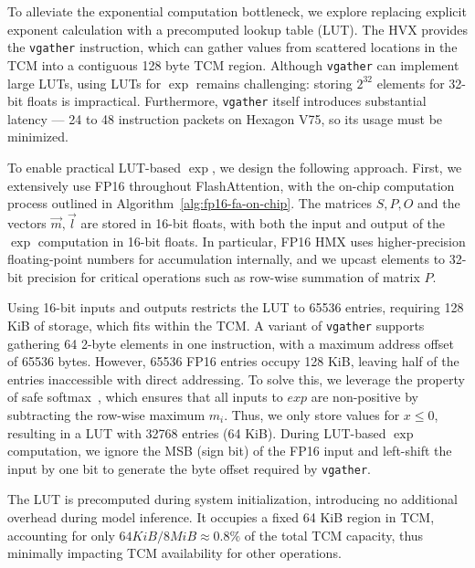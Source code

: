 To alleviate the exponential computation bottleneck, we explore replacing explicit exponent calculation with a precomputed lookup table (LUT). The HVX provides the \texttt{vgather} instruction, which can gather values from scattered locations in the TCM into a contiguous 128 byte TCM region. Although \texttt{vgather} can implement large LUTs, using LUTs for $\exp$ remains challenging: storing $2^{32}$ elements for 32-bit floats is impractical. Furthermore, \texttt{vgather} itself introduces substantial latency — 24 to 48 instruction packets on Hexagon V75, so its usage must be minimized.

To enable practical LUT-based $\exp$, we design the following approach. First, we extensively use FP16 throughout FlashAttention, with the on-chip computation process outlined in Algorithm~\ref{alg:fp16-fa-on-chip}. The matrices $S, P, O$ and the vectors $\vec m, \vec l$ are stored in 16-bit floats, with both the input and output of the $\exp$ computation in 16-bit floats. In particular, FP16 HMX uses higher-precision floating-point numbers for accumulation internally, and we upcast elements to 32-bit precision for critical operations such as row-wise summation of matrix $P$.

Using 16-bit inputs and outputs restricts the LUT to 65536 entries, requiring 128 KiB of storage, which fits within the TCM. A variant of \texttt{vgather} supports gathering 64 2-byte elements in one instruction, with a maximum address offset of 65536 bytes. However, 65536 FP16 entries occupy 128 KiB, leaving half of the entries inaccessible with direct addressing. To solve this, we leverage the property of safe softmax~\cite{online-softmax}, which ensures that all inputs to $exp$ are non-positive by subtracting the row-wise maximum $m_i$. Thus, we only store values for $x\le0$, resulting in a LUT with 32768 entries (64 KiB). During LUT-based $\exp$ computation, we ignore the MSB (sign bit) of the FP16 input and left-shift the input by one bit to generate the byte offset required by \texttt{vgather}.

The LUT is precomputed during system initialization, introducing no additional overhead during model inference. It occupies a fixed 64 KiB region in TCM, accounting for only $64KiB/8MiB\approx0.8\%$ of the total TCM capacity, thus minimally impacting TCM availability for other operations.

